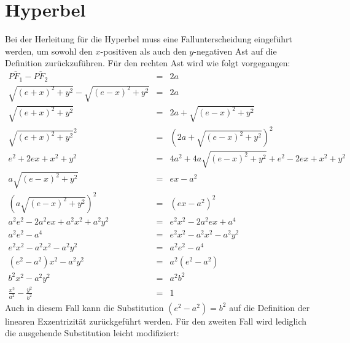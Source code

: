 \section{Hyperbel}
Bei der Herleitung\cite[S.44f]{Scheid:1985}  für die Hyperbel muss eine Fallunterscheidung eingeführt werden, um sowohl den $x$-positiven als auch den $y$-negativen Ast auf die Definition zurückzuführen. Für den rechten Ast wird wie folgt vorgegangen:
\begin{displaymath}
	\begin{array}{rcl}
		\overline{{PF}_1} - \overline{{PF}_2} & = & 2a\\
		\sqrt{{(e+x)}^2 + y^2} - \sqrt{{(e-x)}^2 + y^2} & = & 2a\\
		\sqrt{{(e+x)}^2 + y^2} & = & 2a + \sqrt{{(e-x)}^2 + y^2}\\
		\sqrt{{(e+x)}^2 + y^2}^2 & = & \left (2a + \sqrt{{(e-x)}^2 + y^2}\right )^2\\
		e^2 + 2ex + x^2 + y^2 & = & 4a^2 + 4a \sqrt{(e-x)^2+y^2} + e^2 - 2ex + x^2 + y^2\\
		a\sqrt{{(e-x)}^2 + y^2} & = & ex - a^2\\
		\left (a\sqrt{{(e-x)}^2 + y^2}\right )^2 & = & \left(ex - a^2\right)^2\\
		a^2e^2 - 2a^2ex + a^2x^2 + a^2y^2 &=& e^2x^2 - 2a^2ex + a^4\\
		a^2e^2 - a^4 &=& e^2x^2 - a^2x^2 - a^2y^2\\
		e^2x^2 - a^2x^2 - a^2y^2 &=& a^2e^2 - a^4\\
		\left(e^2 - a^2\right)x^2 - a^2y^2 &=& a^2\left(e^2 - a^2\right)\\
		b^2x^2 - a^2y^2 &=& a^2b^2\\
		\frac{x^2}{a^2} - \frac{y^2}{b^2} &=& 1
	\end{array}
\end{displaymath}
Auch in diesem Fall kann die Substitution $\left(e^2 - a^2\right) = b^2$ auf die Definition der linearen Exzentrizität zurückgeführt werden. Für den zweiten Fall wird lediglich die ausgehende Substitution leicht modifiziert:
